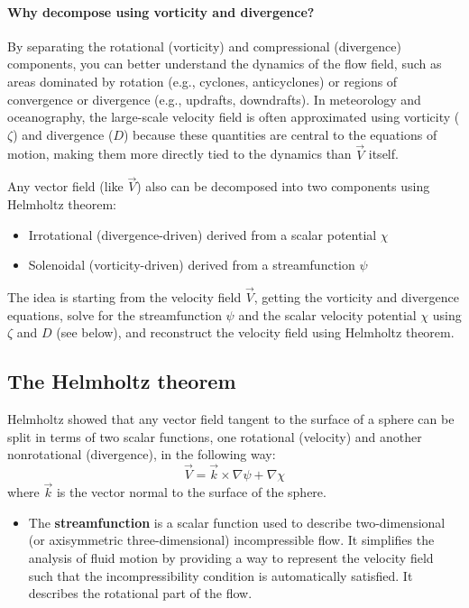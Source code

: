 \paragraph{Why decompose using vorticity and divergence?}
By separating the rotational (vorticity) and compressional (divergence) components, you can better understand the dynamics of the flow field, such as areas dominated by rotation (e.g., cyclones, anticyclones) or regions of convergence or divergence (e.g., updrafts, downdrafts).
In meteorology and oceanography, the large-scale velocity field is often approximated using vorticity ($\zeta$) and divergence ($D$) because these quantities are central to the equations of motion, making them more directly tied to the dynamics than $\vec{V}$ itself.


Any vector field (like $\vec{V}$) also can be decomposed into two components using Helmholtz theorem: 
\begin{itemize}
    \item Irrotational (divergence-driven) derived from a scalar potential $\chi$
    \item Solenoidal (vorticity-driven) derived from a streamfunction $\psi$
\end{itemize}
The idea is starting from the velocity field $\vec{V}$, getting the vorticity and divergence equations, solve for the streamfunction $\psi$ and the scalar velocity potential $\chi$ using $\zeta$ and $D$ (see below), and reconstruct the velocity field using Helmholtz theorem.
\subsection{The Helmholtz theorem}
Helmholtz showed that any vector field tangent to the surface of a sphere can be
split in terms of two scalar functions, one rotational (velocity) and another nonrotational (divergence), in the following way:
\begin{equation}\label{eq.helmholtz}
    \vec{V}=\vec{k}\times\nabla\psi+\nabla\chi
\end{equation}
where $\vec{k}$ is the vector normal to the surface of the sphere. 
\begin{itemize}
    \item The \textbf{streamfunction} is a scalar function used to describe two-dimensional (or axisymmetric three-dimensional) incompressible flow. It simplifies the analysis of fluid motion by providing a way to represent the velocity field such that the incompressibility condition is automatically satisfied. It describes the rotational part of the flow.
\end{itemize}

